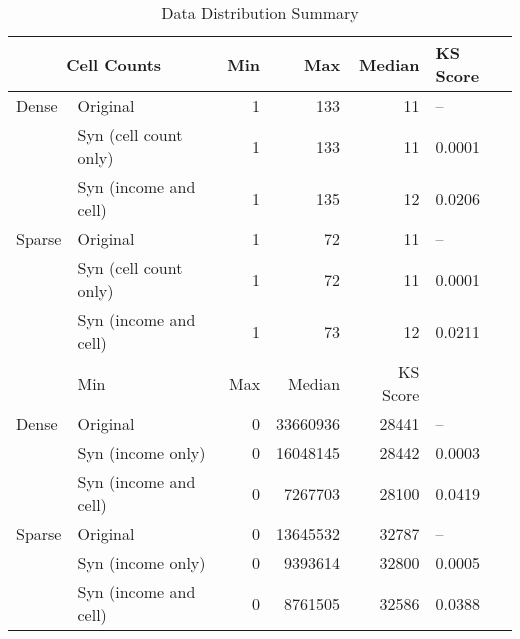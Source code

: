 \begin{table}[htbp]
\centering
\small
\caption{Data Distribution Summary}
\label{tab:region}
\begin{tabular}{llrrrl}
\toprule
\multicolumn{2}{c}{\textbf{Cell Counts}} & Min & Max & Median & KS Score \\
\midrule
Dense & Original & 1 & 133 & 11 & -- \\
 & Syn (cell count only) & 1 & 133 & 11 & 0.0001 \\
 & Syn (income and cell) & 1 & 135 & 12 & 0.0206 \\
\addlinespace
Sparse & Original & 1 & 72 & 11 & -- \\
 & Syn (cell count only) & 1 & 72 & 11 & 0.0001 \\
 & Syn (income and cell) & 1 & 73 & 12 & 0.0211 \\
\addlinespace
\midrule
\multicolumn{2}{c}{\textbf{Income}} & Min & Max & Median & KS Score \\
\midrule
Dense & Original & 0 & 33660936 & 28441 & -- \\
 & Syn (income only) & 0 & 16048145 & 28442 & 0.0003 \\
 & Syn (income and cell) & 0 & 7267703 & 28100 & 0.0419 \\
\addlinespace
Sparse & Original & 0 & 13645532 & 32787 & -- \\
 & Syn (income only) & 0 & 9393614 & 32800 & 0.0005 \\
 & Syn (income and cell) & 0 & 8761505 & 32586 & 0.0388 \\
\bottomrule
\end{tabular}
\end{table}
